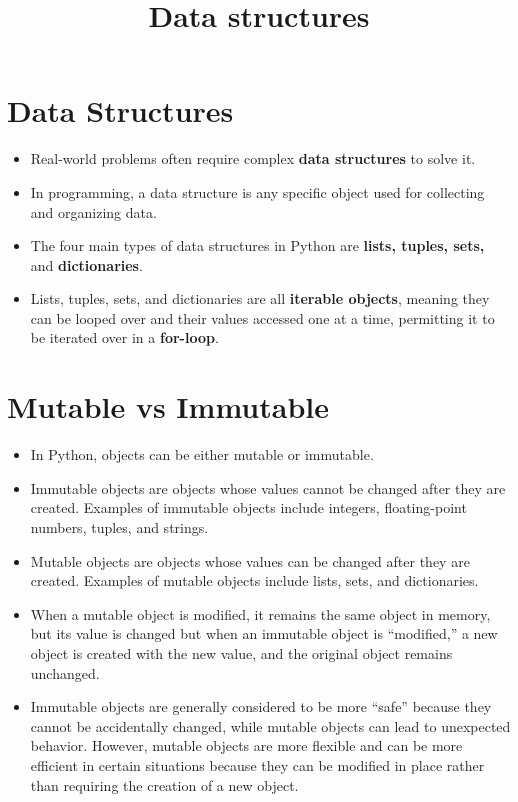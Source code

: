 \documentclass[11pt]{article}
\title{Data structures}
\providecommand{\tightlist}{%
      \setlength{\itemsep}{0pt}\setlength{\parskip}{0pt}}
\begin{document}
    
    \maketitle
    
    

    
    \hypertarget{data-structures}{%
\section{Data Structures}\label{data-structures}}

\begin{itemize}
\tightlist
\item
  Real-world problems often require complex \textbf{data structures} to
  solve it.
\item
  In programming, a data structure is any specific object used for
  collecting and organizing data.
\item
  The four main types of data structures in Python are \textbf{lists,
  tuples, sets,} and \textbf{dictionaries}.
\item
  Lists, tuples, sets, and dictionaries are all \textbf{iterable
  objects}, meaning they can be looped over and their values accessed
  one at a time, permitting it to be iterated over in a
  \textbf{for-loop}.
\end{itemize}

\hypertarget{mutable-vs-immutable}{%
\section{Mutable vs Immutable}\label{mutable-vs-immutable}}

\begin{itemize}
\tightlist
\item
  In Python, objects can be either mutable or immutable.
\item
  Immutable objects are objects whose values cannot be changed after
  they are created. Examples of immutable objects include integers,
  floating-point numbers, tuples, and strings.
\item
  Mutable objects are objects whose values can be changed after they are
  created. Examples of mutable objects include lists, sets, and
  dictionaries.
\item
  When a mutable object is modified, it remains the same object in
  memory, but its value is changed but when an immutable object is
  ``modified,'' a new object is created with the new value, and the
  original object remains unchanged.
\item
  Immutable objects are generally considered to be more ``safe'' because
  they cannot be accidentally changed, while mutable objects can lead to
  unexpected behavior. However, mutable objects are more flexible and
  can be more efficient in certain situations because they can be
  modified in place rather than requiring the creation of a new object.
\end{itemize}
\end{document}
